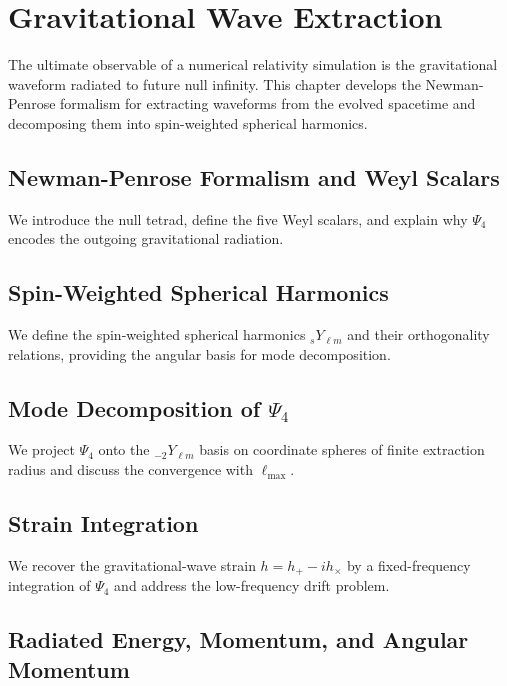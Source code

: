 \chapter{Gravitational Wave Extraction}
\label{ch:wave-extraction}

The ultimate observable of a numerical relativity simulation is the
gravitational waveform radiated to future null infinity. This chapter develops
the Newman-Penrose formalism for extracting waveforms from the evolved
spacetime and decomposing them into spin-weighted spherical harmonics.

\section{Newman-Penrose Formalism and Weyl Scalars}
\label{sec:we-np}

We introduce the null tetrad, define the five Weyl scalars, and explain why
$\Psi_4$ encodes the outgoing gravitational radiation.

\section{Spin-Weighted Spherical Harmonics}
\label{sec:we-swsh}

We define the spin-weighted spherical harmonics ${}_{s}Y_{\ell m}$ and their
orthogonality relations, providing the angular basis for mode decomposition.

\section{Mode Decomposition of \texorpdfstring{$\Psi_4$}{Psi4}}
\label{sec:we-modes}

We project $\Psi_4$ onto the ${}_{-2}Y_{\ell m}$ basis on coordinate spheres of
finite extraction radius and discuss the convergence with $\ell_{\max}$.

\section{Strain Integration}
\label{sec:we-strain}

We recover the gravitational-wave strain $h = h_+ - i h_\times$ by a
fixed-frequency integration of $\Psi_4$ and address the low-frequency
drift problem.

\section{Radiated Energy, Momentum, and Angular Momentum}
\label{sec:we-radiated}

